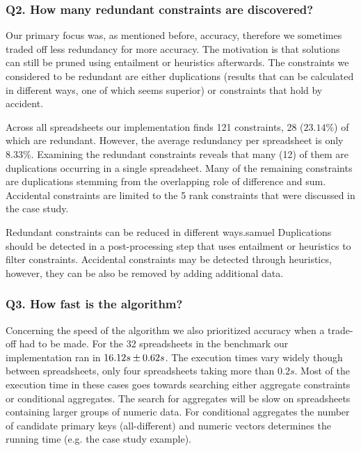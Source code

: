 \documentclass{IEEEtran}
\theoremstyle{definition}
\begin{document}
\subsubsection*{Q2. How many redundant constraints are discovered?}
Our primary focus was, as mentioned before, accuracy, therefore we sometimes traded off less redundancy for more accuracy.
The motivation is that solutions can still be pruned using entailment or heuristics afterwards.
The constraints we considered to be redundant are either duplications (results that can be calculated in different ways, one of which seems superior) or constraints that hold by accident.

Across all spreadsheets our implementation finds 121 constraints, 28 ($23.14\%$) of which are redundant.
However, the average redundancy per spreadsheet is only $8.33\%$.
Examining the redundant constraints reveals that many (12) of them are duplications occurring in a single spreadsheet.
Many of the remaining constraints are duplications stemming from the overlapping role of difference and sum.
Accidental constraints are limited to the 5 rank constraints that were discussed in the case study.

Redundant constraints can be reduced in different ways.samuel
Duplications should be detected in a post-processing step that uses entailment or heuristics to filter constraints.
Accidental constraints may be detected through heuristics, however, they can be also be removed by adding additional data.






\subsubsection*{Q3. How fast is the algorithm?}
Concerning the speed of the algorithm we also prioritized accuracy when a trade-off had to be made.
For the 32 spreadsheets in the benchmark our implementation ran in ${16.12}s \pm {0.62}s$.
The execution times vary widely though between spreadsheets, only four spreadsheets taking more than $0.2s$.
Most of the execution time in these cases goes towards searching either aggregate constraints or conditional aggregates.
The search for aggregates will be slow on spreadsheets containing larger groups of numeric data.
For conditional aggregates the number of candidate primary keys (all-different) and numeric vectors determines the running time (e.g. the case study example).
\end{document}
